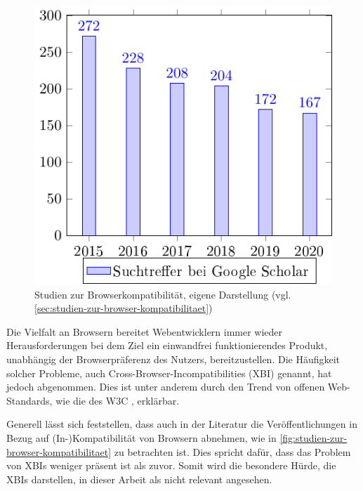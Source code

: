 \begin{figure}
\centering
\includegraphics[width=\linewidth]{img/02_theorie/cross-browser_metastudie.png.pdf}
\caption{Studien zur Browserkompatibilität, eigene Darstellung (vgl. \autoref{sec:studien-zur-browser-kompatibilitaet})}
\label{fig:studien-zur-browser-kompatibilitaet}
\end{figure}

Die Vielfalt an Browsern bereitet Webentwicklern immer wieder Herausforderungen bei dem Ziel ein einwandfrei funktionierendes Produkt, unabhängig der Browserpräferenz des Nutzers, bereitzustellen. Die Häufigkeit solcher Probleme, auch Cross-Browser-Incompatibilities (XBI) \cite{XBIs} genannt, hat jedoch abgenommen. Dies ist unter anderem durch den Trend von offenen Web-Standards, wie die des W3C \cite{W3CStandards}, erklärbar.


Generell lässt sich feststellen, dass auch in der Literatur die Veröffentlichungen in Bezug auf (In-)Kompatibilität von Browsern abnehmen, wie in \autoref{fig:studien-zur-browser-kompatibilitaet} zu betrachten ist. Dies spricht dafür, dass das Problem von XBIs weniger präsent ist als zuvor. Somit wird die besondere Hürde, die XBIs darstellen, in dieser Arbeit als nicht relevant angesehen.

\pagebreak

